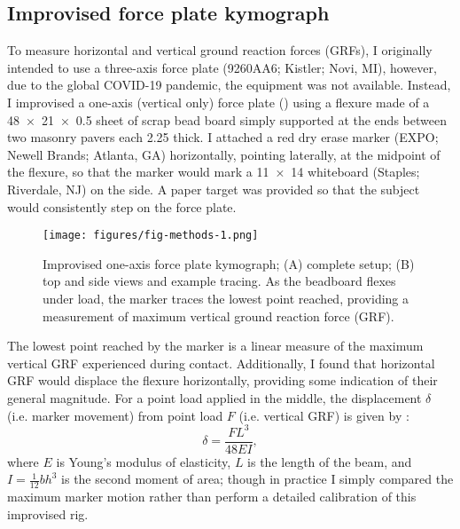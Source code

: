 \subsection{Improvised force plate kymograph}
To measure horizontal and vertical ground reaction forces (GRFs), I originally intended to use a three-axis force plate (9260AA6; Kistler; Novi, MI), however, due to the global COVID-19 pandemic, the equipment was not available. Instead, I improvised a one-axis (vertical only) force plate () using a flexure made of a \SI{48 x 21 x 0.5}{\inch} sheet of scrap bead board simply supported at the ends between two masonry pavers each \SI{2.25}{\inch} thick. I attached a red dry erase marker (EXPO; Newell Brands; Atlanta, GA) horizontally, pointing laterally, at the midpoint of the flexure, so that the marker would mark a \SI{11x14}{\inch} whiteboard (Staples; Riverdale, NJ) on the side. A paper target was provided so that the subject would consistently step on the force plate. 
\begin{figure}
\begin{center}
\texttt{[image: figures/fig-methods-1.png]}
\end{center}
\caption{Improvised one-axis force plate kymograph; (A) complete setup; (B) top and side views and example tracing. As the beadboard flexes under load, the marker traces the lowest point reached, providing a measurement of maximum vertical ground reaction force (GRF).}
\label{fig:methods:forceplate}
\end{figure}
The lowest point reached by the marker is a linear measure of the maximum vertical GRF experienced during contact. Additionally, I found that horizontal GRF would displace the flexure horizontally, providing some indication of their general magnitude. For a point load applied in the middle, the displacement $\delta$ (i.e. marker movement) from point load $F$ (i.e. vertical GRF) is given by \cite{craig2011mechanics}: 
\begin{equation}
\delta = \frac{FL^3}{48 EI},
\label{eq:sensor-response}
\end{equation}
where $E$ is Young's modulus of elasticity, $L$ is the length of the beam, and $I=\frac{1}{12}bh^3$ is the second moment of area; though in practice I simply compared the maximum marker motion rather than perform a detailed calibration of this improvised rig. 

